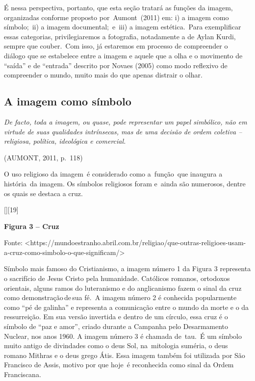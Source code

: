 \documentclass[
  letterpaper,
  a4paper,
  12pt]{scrbook}
\renewenvironment{quote}
  {\par\singlespacing\small\list{}{\rightmargin=0cm \leftmargin=4cm}%
   \item\relax}
  {\endlist}
\begin{document}
É nessa perspectiva, portanto, que esta seção tratará as funções da
imagem, organizadas conforme proposto por~Aumont~(2011) em: i) a imagem
como símbolo;~ii) a imagem documental;~e~iii) a imagem estética.~Para
exemplificar essas categorias, privilegiaremos a fotografia, notadamente
a de Aylan Kurdi, sempre que couber.~Com isso, já estaremos em processo
de compreender o diálogo que se estabelece entre a imagem e aquele que a
olha e o movimento de ``saída'' e de ``entrada'' descrito por Novaes
(2005) como modo reflexivo de compreender o mundo, muito mais do que
apenas distrair o olhar.

\hypertarget{a-imagem-como-suxedmbolo}{%
\subsection{A imagem como símbolo~}\label{a-imagem-como-suxedmbolo}}

\begin{quote}
\emph{De facto, toda a imagem, ou quase, pode representar um papel
simbólico, não em virtude de suas qualidades intrínsecas, mas de uma
decisão de ordem coletiva -- religiosa, política, ideológica e
comercial.}~
\end{quote}

(AUMONT, 2011, p.~118)~

O uso religioso da imagem~é considerado como a~função~que inaugura a
história~da imagem. Os símbolos religiosos foram e~ainda são numerosos,
dentre os quais se destaca a cruz.~

{[}{]}{[}19{]} ~

\protect\hypertarget{_Ref503516204}{}{}\textbf{Figura 3 -- Cruz}

Fonte:
\textless https://mundoestranho.abril.com.br/religiao/que-outras-religioes-usam-a-cruz-como-simbolo-o-que-significam/\textgreater~
~

Símbolo mais famoso do Cristianismo, a imagem número 1 da Figura 3
representa o sacrifício de Jesus Cristo pela humanidade. Católicos
romanos, ortodoxos orientais, alguns ramos do luteranismo e do
anglicanismo fazem o sinal da cruz como demonstração\,de\,sua fé.~A
imagem número 2 é conhecida popularmente como ``pé de galinha'' e
representa a comunicação entre o mundo da morte e o da ressurreição. Em
sua versão invertida e dentro de um círculo, essa cruz é o símbolo de
``paz e amor'', criado durante a Campanha pelo Desarmamento Nuclear, nos
anos 1960. A imagem número 3 é chamada de~tau.~É um símbolo muito antigo
de divindades como o deus Sol, na~mitologia suméria, o deus romano
Mithras e o deus grego Átis. Essa imagem também foi utilizada por São
Francisco de Assis, motivo por que hoje~é reconhecida como sinal da
Ordem Franciscana.~
\end{document}

